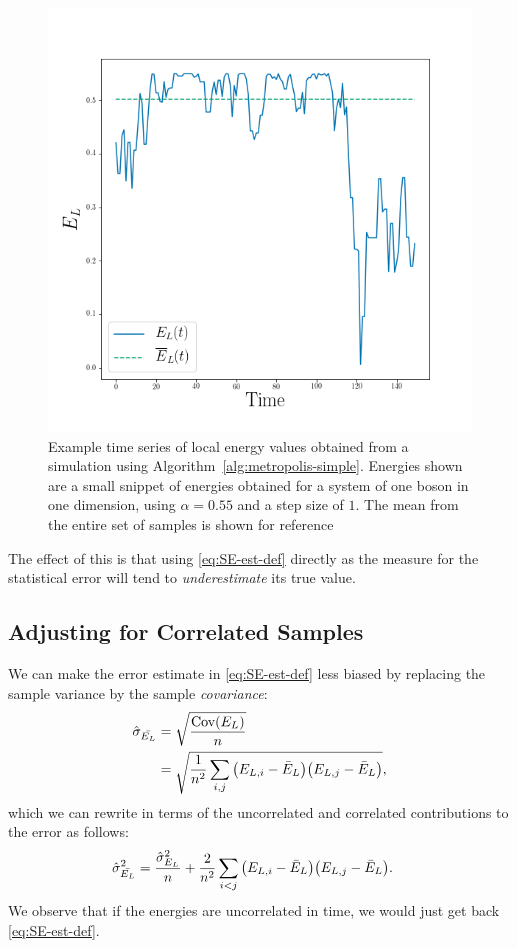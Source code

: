 \documentclass[twocolumn]{article}
\begin{document}
\begin{figure}[ht]
    \centering
    \includegraphics[width=0.8\linewidth]{../results/time-series-example.png}
    \caption{Example time series of local energy values obtained from a
    simulation using Algorithm~\ref{alg:metropolis-simple}. Energies shown
    are a small snippet of energies obtained for a system of one boson in one
    dimension, using $\alpha=0.55$ and a step size of $1$. The mean from the entire set of samples is shown for reference}
    \label{fig:time-series-example}
\end{figure}

The effect of this is that using \eqref{eq:SE-est-def} directly as the measure for
the statistical error will tend to \textit{underestimate} its true value.

\subsection{Adjusting for Correlated Samples}

We can make the error estimate in \eqref{eq:SE-est-def} less biased by replacing
the sample variance by the sample \textit{covariance}:
\begin{align}
    \begin{split}
        \hat{\sigma}_{\bar{ E_L}} &= \sqrt{\frac{\text{Cov}(E_L)}{n}}\\
        &= \sqrt{\frac{1}{n^2}\sum_{i,j}\qty(E_{L,i} - \bar{E}_L)\qty(E_{L,j}-\bar{E}_L)},
    \end{split}
    \label{eq:SE-est-covar-def}
\end{align}
which we can rewrite in terms of the uncorrelated and correlated contributions
to the error as follows:
\begin{align}
    \begin{split}
    \hat{\sigma}^2_{\bar{E_L}} &=
        \frac{\hat{\sigma}^2_{E_L}}{n}
    + \frac{2}{n^2}\sum_{i<j}\qty(E_{L,i} - \bar{E}_L)\qty(E_{L,j}-\bar{E}_L).
    \end{split}\label{eq:SE-est-covar-expanded}
\end{align}
We observe that if the energies are uncorrelated in time, we would just get back
\eqref{eq:SE-est-def}.
\end{document}
